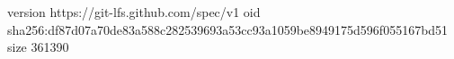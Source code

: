 version https://git-lfs.github.com/spec/v1
oid sha256:df87d07a70de83a588c282539693a53cc93a1059be8949175d596f055167bd51
size 361390
